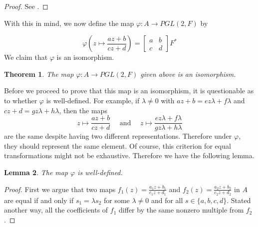 \documentclass[12pt]{article}
\newcommand{\lftmat}[4]{\begin{bmatrix} {#1} & {#2} \\ {#3} & {#4} \end{bmatrix}}
\newcommand{\stanlftmat}{\lftmat{a}{b}{c}{d}}
\theoremstyle{plain}
\newtheorem{theorem}{Theorem}[section]
\newtheorem{lemma}[theorem]{Lemma}
\theoremstyle{definition}
\begin{document}
\begin{appendices}
\begin{proof}
	See \cite{shuman_lfts}.
\end{proof}
	
With this in mind, we now define the map $\varphi\colon A\rightarrow PGL(2,F)$ by

	\[
		\varphi\left(z\mapsto \frac{az + b}{cz + d}\right) = \stanlftmat F^*
	\]
	We claim that $\varphi$ is an isomorphism.
\begin{theorem}\label{thm:function_correspondence}
	The map $\varphi\colon A\rightarrow PGL(2,F)$ given above is an isomorphism.
\end{theorem}

Before we proceed to prove that this map is an isomorphism, it is questionable as to whether $\varphi$ is well-defined. For example, if $\lambda \neq 0$ with $az + b = ez\lambda + f\lambda$ and $cz + d = gz\lambda + h\lambda$, then the maps
\[
	z\mapsto\frac{az + b}{cz + d}\quad\text{ and }\quad z\mapsto\frac{ez\lambda + f\lambda}{gz\lambda + h\lambda}
\]  
are the same despite having two different representations. Therefore under $\varphi$, they should represent the same element. Of course, this criterion for equal transformations might not be exhaustive. Therefore we have the following lemma.

\begin{lemma}\label{thm:well-defined}
	The map $\varphi$ is well-defined.
\end{lemma}

\begin{proof}
	First we argue that two maps $f_1(z) = \frac{a_1z + b_1}{c_1z + d_1}$ and $f_2(z) = \frac{a_2 z + b_2}{c_2 z + d_2}$ in $A$ are equal if and only if $s_1 = \lambda s_2$ for some $\lambda\neq 0$ and for all $s\in\{a,b,c,d\}$. Stated another way, all the coefficients of $f_1$ differ by the same nonzero multiple from $f_2$.
	

\end{proof}
\end{appendices}
\end{document}
